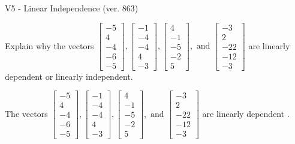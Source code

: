 \begin{exercise}
  \begin{exerciseTitle}V5 - Linear Independence (ver. 863)\end{exerciseTitle}
  \begin{exerciseStatement}
    Explain why the vectors \(\left[\begin{array}{r}
-5 \\
4 \\
-4 \\
-6 \\
-5
\end{array}\right] , \left[\begin{array}{r}
-1 \\
-4 \\
-4 \\
4 \\
-3
\end{array}\right] , \left[\begin{array}{r}
4 \\
-1 \\
-5 \\
-2 \\
5
\end{array}\right] , \text{ and } \left[\begin{array}{r}
-3 \\
2 \\
-22 \\
-12 \\
-3
\end{array}\right]\) are linearly dependent or linearly independent.	


  \end{exerciseStatement}
  \begin{exerciseAnswer}
   The vectors \(\left[\begin{array}{r}
-5 \\
4 \\
-4 \\
-6 \\
-5
\end{array}\right] , \left[\begin{array}{r}
-1 \\
-4 \\
-4 \\
4 \\
-3
\end{array}\right] , \left[\begin{array}{r}
4 \\
-1 \\
-5 \\
-2 \\
5
\end{array}\right] , \text{ and } \left[\begin{array}{r}
-3 \\
2 \\
-22 \\
-12 \\
-3
\end{array}\right]\) are 
  	 linearly dependent  .
  


  \end{exerciseAnswer}
\end{exercise}